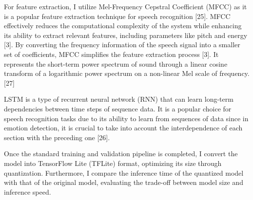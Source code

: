 For feature extraction, I utilize Mel-Frequency Cepstral Coefficient (MFCC) as it is a popular feature extraction technique for speech recognition [25]. MFCC effectively reduces the computational complexity of the system while enhancing its ability to extract relevant features, including parameters like pitch and energy [3]. By converting the frequency information of the speech signal into a smaller set of coefficients, 
MFCC simplifies the feature extraction process [3]. It represents the short-term power spectrum of sound through a linear cosine transform of a logarithmic power spectrum on a non-linear Mel scale of frequency. [27]

LSTM is a type of recurrent neural network (RNN) that can learn long-term dependencies between time steps of sequence data. It is a popular choice for speech recognition tasks due to its ability to learn from sequences of data since in emotion detection,  it is crucial to take into account the interdependence of each section with the preceding one [26].

Once the standard training and validation pipeline is completed, I convert the model into TensorFlow Lite (TFLite) format, optimizing its size through quantization. Furthermore, I compare the inference time of the quantized model with that of the original model, evaluating the trade-off between model size and inference speed.
